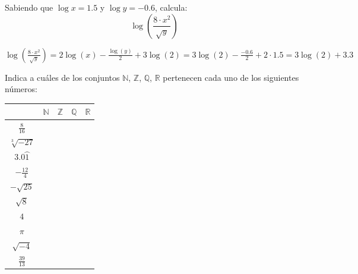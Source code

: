 \documentclass[addpoints,spanish, 12pt,a4paper]{exam}
\begin{document}
\begin{questions}


\question[1] Sabiendo que $\log x=1.5$ y $\log y=-0.6$, calcula: $$\log (\frac{8\cdot x^2}{\sqrt{y}})$$
\begin{solution}
$\log (\frac{8\cdot x^2}{\sqrt{y}})=2 \log{\left(x \right)} - \frac{\log{\left(y \right)}}{2} + 3 \log{\left(2 \right)}=3 \log{\left(2 \right)} - \frac{-0.6}{2} + 2 \cdot 1.5=3 \log{\left(2 \right)} + 3.3$
\end{solution}


\question[1] Indica a cuáles de los conjuntos
$\mathbb{N}$, $\mathbb{Z}$, $\mathbb{Q}$, $\mathbb{R}$ pertenecen cada uno de los siguientes números:
\begin{center}
\begin{tabular}{|c |c |c |c |c|}\hline
&$\mathbb{N}$& $\mathbb{Z}$& $\mathbb{Q}$&$\mathbb{R}$\\ 
\hline
$\frac{8}{16}$&&&&\\
\hline
$\sqrt[3]{-27}$&&&&\\
\hline
$3.0\wideparen{1}$&&&&\\
\hline
$-\frac{12}{4}$&&&&\\
\hline
$-\sqrt{25}$&&&&\\
\hline
$\sqrt{8}$&&&&\\
\hline
$4$&&&&\\
\hline
$\pi$&&&&\\
\hline
$\sqrt{-4}$&&&&\\
\hline
$\frac{39}{13}$&&&&\\
\hline
\end{tabular}


\end{center}
\end{questions}
\end{document}
